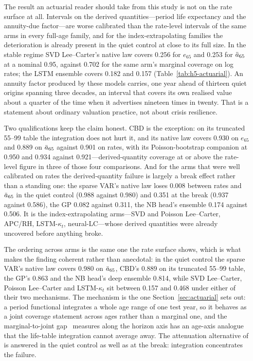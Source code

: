 The result an actuarial reader should take from this study is not on the
rate surface at all. Intervals on the derived quantities---period life
expectancy and the annuity-due factor---are worse calibrated than the
rate-level intervals of the same arms in every full-age family, and for
the index-extrapolating families the deterioration is already present in
the quiet control at close to its full size. In the stable regime SVD
Lee--Carter's native law covers 0.256 for $e_{65}$ and 0.253 for
$\ddot{a}_{65}$ at a nominal 0.95, against 0.702 for the same arm's marginal
coverage on log rates; the LSTM ensemble covers 0.182 and 0.157
(Table~\ref{tab:h5-actuarial}). An annuity factor produced by these
models carries, one year ahead of thirteen quiet origins spanning three
decades, an interval that covers its own realised value about a quarter
of the time when it advertises nineteen times in twenty. That is a
statement about ordinary valuation practice, not about crisis
resilience.

Two qualifications keep the claim honest. CBD is the exception: on its
truncated 55--99 table the integration does not hurt it, and its native
law covers 0.930 on $e_{65}$ and 0.889 on $\ddot{a}_{65}$ against 0.901 on
rates, with its Poisson-bootstrap companion at 0.950 and 0.934 against
0.921---derived-quantity coverage at or above the rate-level figure in
three of those four comparisons. And for the arms that were well
calibrated on rates the derived-quantity failure is largely a break
effect rather than a standing one: the sparse VAR's native law loses
0.008 between rates and $\ddot{a}_{65}$ in the quiet control (0.988 against
0.980) and 0.351 at the break (0.937 against 0.586), the GP 0.082 against
0.311, the NB head's ensemble 0.174 against 0.506. It is the
index-extrapolating arms---SVD and Poisson Lee--Carter, APC/RH,
LSTM-$\kappa_t$, neural-LC---whose derived quantities were already
uncovered before anything broke.

The ordering across arms is the same one the rate surface shows, which is
what makes the finding coherent rather than anecdotal: in the quiet
control the sparse VAR's native law covers 0.980 on $\ddot{a}_{65}$, CBD's
0.889 on its truncated 55--99 table, the GP's 0.863 and the NB head's
deep ensemble 0.814, while SVD Lee--Carter, Poisson Lee--Carter and
LSTM-$\kappa_t$ sit between 0.157 and 0.468 under either of their two
mechanisms. The mechanism is the one Section~\ref{sec:actuarial} sets out:
a period functional integrates a whole age range of one test year, so it
behaves as a joint coverage statement across ages rather than a marginal
one, and the marginal-to-joint gap \Hthree\ measures along the horizon
axis has an age-axis analogue that the life-table integration cannot
average away. The attenuation
alternative of \citet{cairns2011mortality} is answered in the quiet
control as well as at the break: integration concentrates the failure.

